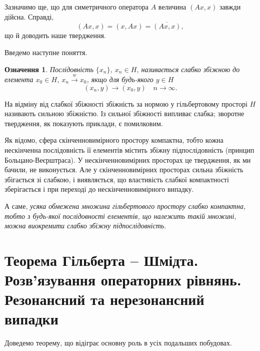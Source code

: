 \documentclass[14pt,twoside]{extreport}
\theoremstyle{mystyle}
\newtheorem{dfn}{Означення}
\numberwithin{equation}{chapter}
\begin{document}
Зазначимо ще, що для симетричного оператора $A$ величина $(Ax, x)$ завжди дійсна. Справді,
\[
 (Ax, x) = (x, Ax) = \overline{(Ax, x)},
\]
що й доводить наше твердження.

Введемо наступне поняття.
\begin{dfn}
 Послідовність $\{x_n\}$, $x_n \in H$, називається слабко збіжною до елемента $x_0 \in H$, $x_n \xrightarrow{w} x_0$, якщо для будь-якого $y \in H$
 \[
  (x_n, y) \to (x_0, y) \quad n\to \infty.
 \]
\end{dfn}

На відміну від слабкої збіжності збіжність за нормою у гільбертовому просторі $H$ називають сильною збіжністю. Із сильної збіжності випливає слабка; зворотне твердження, як показують приклади, є помилковим.

Як відомо, сфера скінченновимірного простору компактна, тобто кожна нескінченна послідовність її елементів містить збіжну підпослідовність (принцип Больцано-Веєрштраса). У нескінченновимірних просторах це твердження, як ми бачили, не виконується. Але у скінченновимірних просторах сильна збіжність збігається зі слабкою, і виявляється, що властивість слабкої компактності зберігається і при переході до нескінченновимірного випадку.

А саме, \emph{усяка обмежена множина гільбертового простору слабко компактна, тобто з будь-якої послідовності елементів, що належить такій множині, можна виокремити слабко збіжну підпослідовність}.

\section{Теорема Гільберта -- Шмідта. Розв'язування операторних рівнянь. Резонансний та нерезонансний випадки}

Доведемо теорему, що відіграє основну роль в усіх подальших побудовах.
\end{document}
